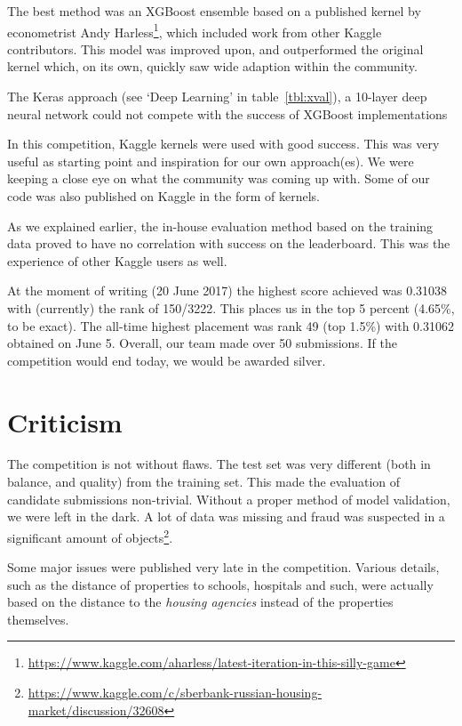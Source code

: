\documentclass[a4paper,11pt,twocolumn]{article}
\begin{document}
The best method was an XGBoost ensemble based on a published kernel by econometrist Andy
Harless\footnote{\url{https://www.kaggle.com/aharless/latest-iteration-in-this-silly-game}},
which included work from other Kaggle contributors. This model was improved
upon, and outperformed the original kernel which, on its own, quickly saw wide
adaption within the community.

The Keras approach (see `Deep Learning' in table~\ref{tbl:xval}), a
10-layer deep neural network could not compete with the success of XGBoost
implementations

In this competition, Kaggle kernels were used with good success. This was very useful as starting point
and inspiration for our own approach(es). We were keeping a close eye on what
the community was coming up with. Some of our code was also published on Kaggle
in the form of kernels.

As we explained earlier, the in-house evaluation method based on the training
data proved to have no correlation with success on the leaderboard. This was the
experience of other Kaggle users as well.

At the moment of writing (20 June 2017) the highest score achieved was 0.31038
with (currently) the rank of 150/3222. This places us in the top 5 percent
(4.65\%, to be exact). The all-time highest placement was rank 49 (top 1.5\%)
with 0.31062 obtained on June 5. Overall, our team made over 50 submissions. If
the competition would end today, we would be awarded silver.

\section{Criticism}
The competition is not without flaws. The test set was very different (both in
balance, and quality) from the training set. This made the evaluation of
candidate submissions non-trivial. Without a proper method of model validation,
we were left in the dark. A lot of data was missing and fraud was suspected in a
significant amount of
objects\footnote{\url{https://www.kaggle.com/c/sberbank-russian-housing-market/discussion/32608}}.

Some major issues were published very late in the competition. Various
details, such as the distance of properties to schools, hospitals and such, were
actually based on the distance to the \emph{housing agencies} instead of the
properties themselves.

\newpage

\onecolumn
\end{document}
